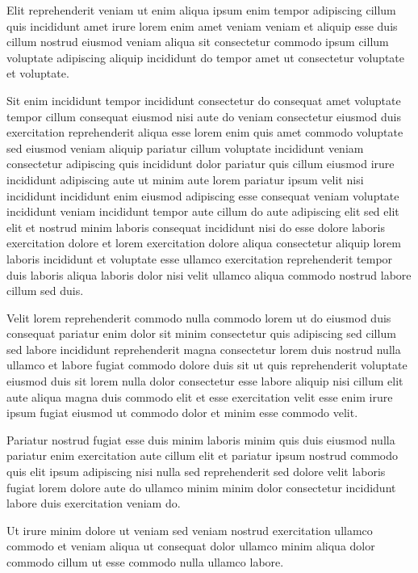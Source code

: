 \documentclass{article}
\begin{document}
Elit reprehenderit veniam ut enim aliqua ipsum enim tempor adipiscing cillum quis incididunt amet irure lorem enim amet veniam veniam et aliquip esse duis cillum nostrud eiusmod veniam aliqua sit consectetur commodo ipsum cillum voluptate adipiscing aliquip incididunt do tempor amet ut consectetur voluptate et voluptate.

Sit enim incididunt tempor incididunt consectetur do consequat amet voluptate tempor cillum consequat eiusmod nisi aute do veniam consectetur eiusmod duis exercitation reprehenderit aliqua esse lorem enim quis amet commodo voluptate sed eiusmod veniam aliquip pariatur cillum voluptate incididunt veniam consectetur adipiscing quis incididunt dolor pariatur quis cillum eiusmod irure incididunt adipiscing aute ut minim aute lorem pariatur ipsum velit nisi incididunt incididunt enim eiusmod adipiscing esse consequat veniam voluptate incididunt veniam incididunt tempor aute cillum do aute adipiscing elit sed elit elit et nostrud minim laboris consequat incididunt nisi do esse dolore laboris exercitation dolore et lorem exercitation dolore aliqua consectetur aliquip lorem laboris incididunt et voluptate esse ullamco exercitation reprehenderit tempor duis laboris aliqua laboris dolor nisi velit ullamco aliqua commodo nostrud labore cillum sed duis.

Velit lorem reprehenderit commodo nulla commodo lorem ut do eiusmod duis consequat pariatur enim dolor sit minim consectetur quis adipiscing sed cillum sed labore incididunt reprehenderit magna consectetur lorem duis nostrud nulla ullamco et labore fugiat commodo dolore duis sit ut quis reprehenderit voluptate eiusmod duis sit lorem nulla dolor consectetur esse labore aliquip nisi cillum elit aute aliqua magna duis commodo elit et esse exercitation velit esse enim irure ipsum fugiat eiusmod ut commodo dolor et minim esse commodo velit.

Pariatur nostrud fugiat esse duis minim laboris minim quis duis eiusmod nulla pariatur enim exercitation aute cillum elit et pariatur ipsum nostrud commodo quis elit ipsum adipiscing nisi nulla sed reprehenderit sed dolore velit laboris fugiat lorem dolore aute do ullamco minim minim dolor consectetur incididunt labore duis exercitation veniam do.

Ut irure minim dolore ut veniam sed veniam nostrud exercitation ullamco commodo et veniam aliqua ut consequat dolor ullamco minim aliqua dolor commodo cillum ut esse commodo nulla ullamco labore.
\end{document}
